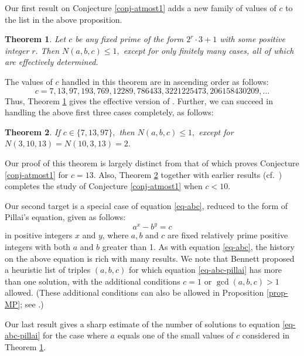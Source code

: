 \documentclass[11pt]{amsart}
\newtheorem{thm}{Theorem}%
\numberwithin{equation}{section}
\begin{document}
Our first result on Conjecture \ref{conj-atmost1} adds a new family of values of $c$ to the list in the above proposition.

\begin{thm}\label{th-c7etc}
Let $c$ be any fixed prime of the form $2^r \cdot 3+1$ with some positive integer $r.$
Then $N(a,b,c) \le 1,$ except for only finitely many cases, 
all of which are effectively determined.
\end{thm}

The values of $c$ handled in this theorem are in ascending order as follows:
\begin{equation} \label{E3primes}
c=7, 13, 97, 193, 769, 12289, 786433,3221225473, 206158430209,\ldots
\end{equation}
Thus, Theorem \ref{th-c7etc} gives the effective version of \cite[Theorem 2]{MP3}.
Further, we can succeed in handling the above first three cases completely, as follows:
%
\begin{thm}\label{th-c7c13c97}
If $c \in \{7, 13, 97\},$ then $N(a,b,c) \le 1,$ except for $N(3,10,13)=N(10,3,13)=2.$
\end{thm}
%
Our proof of this theorem is largely distinct from that of \cite[Theorem 3]{MP3} which proves Conjecture \ref{conj-atmost1} for $c=13$. 
Also, Theorem \ref{th-c7c13c97} together with earlier results (cf.~\cite{MP2,MP3}) completes the study of Conjecture \ref{conj-atmost1} when $c<10$.

Our second target is a special case of equation \eqref{eq-abc}, reduced to the form of Pillai's equation, given as follows:
\begin{equation} \label{eq-abc-pillai}
a^x-b^y=c
\end{equation}
in positive integers $x$ and $y$, where $a,b$ and $c$ are fixed relatively prime positive integers with both $a$ and $b$ greater than 1.
As with equation \eqref{eq-abc}, the history on the above equation is rich with many results. 
We note that Bennett \cite{Be} proposed a heuristic list of triples $(a,b,c)$ for which equation \eqref{eq-abc-pillai} has more than one solution, with the additional conditions $c=1$ or $\gcd(a,b,c)>1$ allowed. (These additional conditions can also be allowed in Proposition \ref{prop-MP}; see \cite{ScSt2}.)  

Our last result gives a sharp estimate of the number of solutions to equation \eqref{eq-abc-pillai} for the case where $a$ equals one of the small values of $c$ considered in Theorem \ref{th-c7etc}. 
\end{document}
